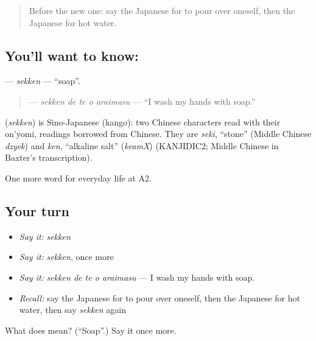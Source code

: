 \label{lesson:JA-C147-sekken}



\begin{quote}
Before the new one: say the Japanese for to pour over oneself, then the Japanese for hot water.
\end{quote}

\subsection*{You'll want to know: }
\textbf{} — \emph{sekken} — \textquotedblleft{}soap\textquotedblright{}.

\begin{quote}
\textbf{  } — \emph{sekken de te o araimasu} — \textquotedblleft{}I wash my hands with soap.\textquotedblright{}
\end{quote}

\begin{cousinweb}
\textbf{} (\emph{sekken}) is Sino-Japanese (kango): two Chinese characters read with their on'yomi, readings borrowed from Chinese. They are \emph{seki}, \textquotedblleft{}stone\textquotedblright{} (Middle Chinese \emph{dzyek}) and \emph{ken}, \textquotedblleft{}alkaline salt\textquotedblright{} (\emph{keamX}) (KANJIDIC2; Middle Chinese in Baxter's transcription).
\end{cousinweb}

\begin{grammarlens}[title={What you've built}]
One more word for everyday life at A2.
\end{grammarlens}

\subsection*{Your turn}
\begin{itemize}
\raggedright
  \item \emph{Say it:} \emph{sekken}
  \item \emph{Say it:} \emph{sekken}, once more
  \item \emph{Say it:} \emph{sekken de te o araimasu} — I wash my hands with soap.
  \item \emph{Recall:} say the Japanese for to pour over oneself, then the Japanese for hot water, then say \emph{sekken} again
\end{itemize}

\begin{tcolorbox}[breakable,colback=teal!4,colframe=teal!35!black,title={Before you move on}]
What does  mean? (\textquotedblleft{}Soap\textquotedblright{}.) Say it once more.
\end{tcolorbox}
